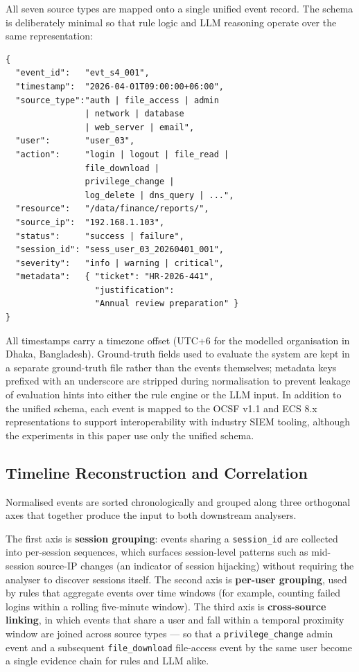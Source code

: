\documentclass[conference]{IEEEtran}
\begin{document}
All seven source types are mapped onto a single unified event record. The schema is deliberately minimal so that rule logic and LLM reasoning operate over the same representation:

\begin{verbatim}
{
  "event_id":   "evt_s4_001",
  "timestamp":  "2026-04-01T09:00:00+06:00",
  "source_type":"auth | file_access | admin
                | network | database
                | web_server | email",
  "user":       "user_03",
  "action":     "login | logout | file_read |
                file_download |
                privilege_change |
                log_delete | dns_query | ...",
  "resource":   "/data/finance/reports/",
  "source_ip":  "192.168.1.103",
  "status":     "success | failure",
  "session_id": "sess_user_03_20260401_001",
  "severity":   "info | warning | critical",
  "metadata":   { "ticket": "HR-2026-441",
                  "justification":
                  "Annual review preparation" }
}
\end{verbatim}

All timestamps carry a timezone offset (UTC+6 for the modelled organisation in Dhaka, Bangladesh). Ground-truth fields used to evaluate the system are kept in a separate ground-truth file rather than the events themselves; metadata keys prefixed with an underscore are stripped during normalisation to prevent leakage of evaluation hints into either the rule engine or the LLM input. In addition to the unified schema, each event is mapped to the OCSF v1.1 and ECS 8.x representations to support interoperability with industry SIEM tooling, although the experiments in this paper use only the unified schema.

\subsection{Timeline Reconstruction and Correlation}
\label{sec:timeline}

Normalised events are sorted chronologically and grouped along three orthogonal axes that together produce the input to both downstream analysers.

The first axis is \textbf{session grouping}: events sharing a \texttt{session\_id} are collected into per-session sequences, which surfaces session-level patterns such as mid-session source-IP changes (an indicator of session hijacking) without requiring the analyser to discover sessions itself. The second axis is \textbf{per-user grouping}, used by rules that aggregate events over time windows (for example, counting failed logins within a rolling five-minute window). The third axis is \textbf{cross-source linking}, in which events that share a user and fall within a temporal proximity window are joined across source types --- so that a \texttt{privilege\_change} admin event and a subsequent \texttt{file\_download} file-access event by the same user become a single evidence chain for rules and LLM alike.
\end{document}
